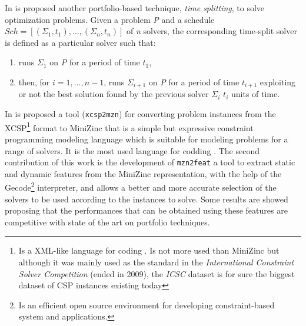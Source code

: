 In \cite{Amadini2014} is proposed another portfolio-based technique, \textit{time splitting}, to solve optimization problems. Given a problem \textit{P} and a schedule $Sch = \left[(\Sigma_1, t_1),\dots,(\Sigma_n, t_n)\right]$ of \textit{n} solvers, the corresponding time-split solver is defined as a particular solver such that:  
\begin{enumerate}[label=\alph*)]
\item runs $\Sigma_1$ on \textit{P} for a period of time $t_1$, 
\item then, for $i = 1,\dots, n-1$, runs $\Sigma_{i+1}$ on \textit{P} for a period of time $t_{i+1}$ exploiting or not the best solution found by the previous solver $\Sigma_i$ $t_i$ units of time.
\end{enumerate}




In \cite{Amadini} is proposed a tool (\texttt{xcsp2mzn}) for converting problem instances from the {\sc XCSP}\footnote{Is a XML-like language for coding \csps. Is not more used than {\sc MiniZinc} but although it was mainly used as the standard in the {\it International Constraint Solver Competition} (ended in 2009), the {\it ICSC} dataset is for sure the biggest dataset of CSP instances existing today} format  \cite{Committee} to {\sc MiniZinc} that is a simple but expressive constraint programming modeling language which is suitable for modeling problems for a range of solvers. It is the most used language for codding \csps{} \cite{Nethercote}. The second contribution of this work is the development of \texttt{mzn2feat} a tool to extract static and dynamic features from the {\sc MiniZinc} representation, with the help of the {\sc Gecode}\footnote{Is an efficient open source environment for developing constraint-based system and applications.} \cite{Gecode} interpreter, and allows a better and more accurate selection of the solvers to be used according to the instances to solve. Some results are showed proposing that the performances that can be obtained using these features are competitive with state of the art on \csp{} portfolio techniques.

